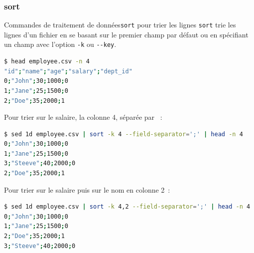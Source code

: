 \documentclass{beamer}
\begin{document}
    \subsubsection{sort}\label{subsubsec:sort}
    \begin{frame}[fragile]{Commandes de traitement de données}{\lstinline{sort} pour trier les lignes}
        \lstinline{sort} trie les lignes d'un fichier en se basant sur le premier champ par défaut ou en spécifiant un champ avec l'option \lstinline{-k} ou \lstinline{--key}.
        \begin{lstlisting}[language=bash,basicstyle=\tiny\ttfamily]
$ head employee.csv -n 4
"id";"name";"age";"salary";"dept_id"
0;"John";30;1000;0
1;"Jane";25;1500;0
2;"Doe";35;2000;1
        \end{lstlisting}
        Pour trier sur le salaire, la colonne 4, séparée par \textquote{;}~:
        \begin{lstlisting}[language=bash,basicstyle=\tiny\ttfamily]
$ sed 1d employee.csv | sort -k 4 --field-separator=';' | head -n 4
0;"John";30;1000;0
1;"Jane";25;1500;0
3;"Steeve";40;2000;0
2;"Doe";35;2000;1
        \end{lstlisting}
        Pour trier sur le salaire puis sur le nom en colonne 2~:
        \begin{lstlisting}[language=bash,basicstyle=\tiny\ttfamily]
$ sed 1d employee.csv | sort -k 4,2 --field-separator=';' | head -n 4
0;"John";30;1000;0
1;"Jane";25;1500;0
2;"Doe";35;2000;1
3;"Steeve";40;2000;0
        \end{lstlisting}
    \end{frame}
\end{document}
